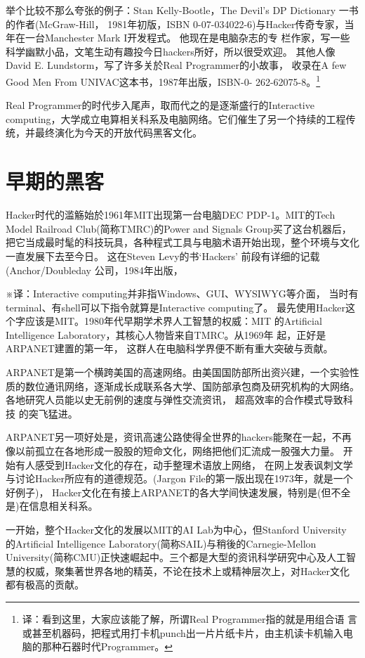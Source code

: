 \documentclass[a4paper,12pt,UTF8,twoside]{ctexbook}
\begin{document}
举个比较不那么夸张的例子：Stan Kelly-Bootle，The Devil's DP Dictionary 一书的作者(McGraw-Hill， 1981年初版，ISBN 0-07-034022-6)与Hacker传奇专家，当年在一台Manchester Mark I开发程式。 他现在是电脑杂志的专
栏作家，写一些科学幽默小品，文笔生动有趣投今日hackers所好，所以很受欢迎。 其他人像David E. Lundstorm，写了许多关於Real Programmer的小故事， 收录在A few Good Men From UNIVAC这本书，1987年出版，ISBN-0- 262-62075-8。\footnote{译：看到这里，大家应该能了解，所谓Real Programmer指的就是用组合语 言或甚至机器码，把程式用打卡机punch出一片片纸卡片，由主机读卡机输入电脑的那种石器时代Programmer。}

Real Programmer的时代步入尾声，取而代之的是逐渐盛行的Interactive computing，大学成立电算相关科系及电脑网络。它们催生了另一个持续的工程传统，并最终演化为今天的开放代码黑客文化。

\chapter{早期的黑客}

Hacker时代的滥觞始於1961年MIT出现第一台电脑DEC PDP-1。MIT的Tech Model Railroad Club(简称TMRC)的Power and Signals Group买了这台机器后，把它当成最时髦的科技玩具，各种程式工具与电脑术语开始出现，整个环境与文化一直发展下去至今日。 这在Steven Levy的书`Hackers' 前段有详细的记载(Anchor/Doubleday 公司，1984年出版，

※译：Interactive computing并非指Windows、GUI、WYSIWYG等介面， 当时有terminal、有shell可以下指令就算是Interactive computing了。 最先使用Hacker这个字应该是MIT。1980年代早期学术界人工智慧的权威：MIT 的Artificial Intelligence Laboratory，其核心人物皆来自TMRC。从1969年 起，正好是ARPANET建置的第一年， 这群人在电脑科学界便不断有重大突破与贡献。

ARPANET是第一个横跨美国的高速网络。由美国国防部所出资兴建，一个实验性 质的数位通讯网络，逐渐成长成联系各大学、国防部承包商及研究机构的大网络。 各地研究人员能以史无前例的速度与弹性交流资讯， 超高效率的合作模式导致科技 的突飞猛进。

ARPANET另一项好处是，资讯高速公路使得全世界的hackers能聚在一起，不再像以前孤立在各地形成一股股的短命文化，网络把他们汇流成一股强大力量。 开始有人感受到Hacker文化的存在，动手整理术语放上网络， 在网上发表讽刺文学与讨论Hacker所应有的道德规范。(Jargon File的第一版出现在1973年，就是一个好例子)， Hacker文化在有接上ARPANET的各大学间快速发展，特别是(但不全是)在信息相关科系。

一开始，整个Hacker文化的发展以MIT的AI Lab为中心，但Stanford University 的Artificial Intelligence Laboratory(简称SAIL)与稍後的Carnegie-Mellon University(简称CMU)正快速崛起中。三个都是大型的资讯科学研究中心及人工智慧的权威，聚集著世界各地的精英，不论在技术上或精神层次上，对Hacker文化都有极高的贡献。
\end{document}

